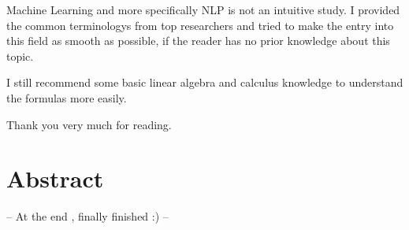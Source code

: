 Machine Learning and more specifically NLP is not an intuitive study. I provided the common terminologys from top researchers and tried to make the entry into this field as smooth as possible, if the reader has no prior knowledge about this topic.

I still recommend some basic linear algebra and calculus knowledge to understand the formulas more easily.

Thank you very much for reading.

\newpage

\section*{Abstract}
\label{sec:abstract}

-- At the end , finally finished :) --
